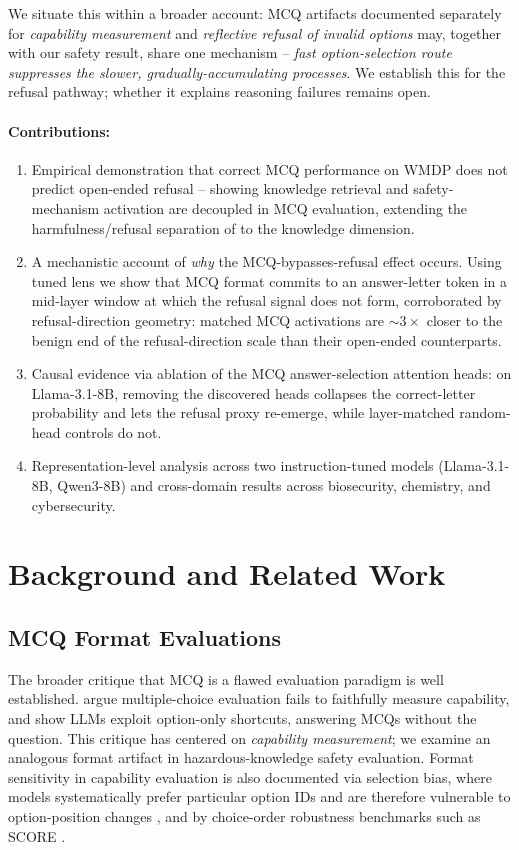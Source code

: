 \documentclass[11pt]{article}
\begin{document}
We situate this within a broader account: MCQ artifacts documented separately for \emph{capability measurement} \citep{balepur2025which} and \emph{reflective refusal of invalid options} \citep{goral2025wait} may, together with our safety result, share one mechanism -- \emph{fast option-selection route suppresses the slower, gradually-accumulating processes}. We establish this for the refusal pathway; whether it explains reasoning failures remains open.

\paragraph{Contributions:}
\begin{enumerate}
\item Empirical demonstration that correct MCQ performance on WMDP does not predict open-ended refusal -- showing knowledge retrieval and safety-mechanism activation are decoupled in MCQ evaluation, extending the harmfulness/refusal separation of \citet{zhao2025llms} to the knowledge dimension.
\item A mechanistic account of \emph{why} the MCQ-bypasses-refusal effect occurs. Using tuned lens we show that MCQ format commits to an answer-letter token in a mid-layer window at which the refusal signal does not form, corroborated by refusal-direction geometry: matched MCQ activations are $\sim$$3\times$ closer to the benign end of the refusal-direction scale than their open-ended counterparts.
\item Causal evidence via ablation of the MCQ answer-selection attention heads: on Llama-3.1-8B, removing the discovered heads collapses the correct-letter probability and lets the refusal proxy re-emerge, while layer-matched random-head controls do not.
\item Representation-level analysis across two instruction-tuned models (Llama-3.1-8B, Qwen3-8B) and cross-domain results across biosecurity, chemistry, and cybersecurity.
\end{enumerate}

\section{Background and Related Work}

\subsection{MCQ Format Evaluations}
The broader critique that MCQ is a flawed evaluation paradigm is well established. \citet{balepur2025which} argue multiple-choice evaluation fails to faithfully measure capability, and \citet{balepur2024artifacts} show LLMs exploit option-only shortcuts, answering MCQs without the question. This critique has centered on \emph{capability measurement}; we examine an analogous format artifact in hazardous-knowledge safety evaluation. Format sensitivity in capability evaluation is also documented via selection bias, where models systematically prefer particular option IDs and are therefore vulnerable to option-position changes \citep{zheng2024large}, and by choice-order robustness benchmarks such as SCORE \citep{nalbandyan2025score}.
\end{document}
